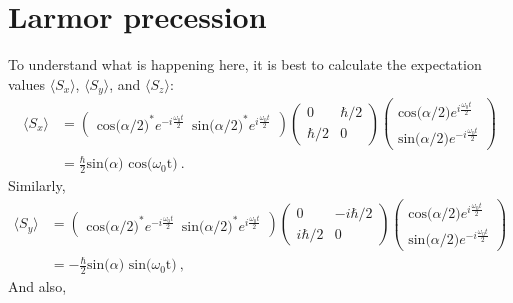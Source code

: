 \section{Larmor precession\label{sec:Larmor}}
To understand what is happening here, it is best to calculate the
expectation values $\langle S_x \rangle$, $\langle S_y \rangle$, and
$\langle S_z \rangle$:
\begin{align}
  \langle S_{x} \rangle & =
                          \begin{pmatrix} \textrm{cos($\alpha$/2)}^{*} e^{-i \frac{\omega_{0}t}{2}} \,\,\, \textrm{sin($\alpha$/2)}^{*} e^{i \frac{\omega_{0}t}{2}}
                          \end{pmatrix}
                          \begin{pmatrix} 0 & \hbar/2\\ \hbar/2 & 0
                          \end{pmatrix}
                                                                  \begin{pmatrix} \textrm{cos($\alpha$/2)} e^{i \frac{\omega_{0}t}{2}}\\ \textrm{sin($\alpha$/2)} e^{-i \frac{\omega_{0}t}{2}} \end{pmatrix}  \\ \nonumber
  & = \frac{\hbar}{2}\textrm{sin($\alpha$) cos($\omega_{0}$t)}~.
\end{align}
Similarly,
\begin{equation}
\begin{split}
\langle S_{y} \rangle & = \begin{pmatrix} \textrm{cos($\alpha$/2)}^{*} e^{-i \frac{\omega_{0}t}{2}} \,\,\, \textrm{sin($\alpha$/2)}^{*} e^{i \frac{\omega_{0}t}{2}} \end{pmatrix}  \begin{pmatrix} 0 & -i\hbar/2\\ i\hbar/2 & 0 \end{pmatrix}  \begin{pmatrix} \textrm{cos($\alpha$/2)} e^{i \frac{\omega_{0}t}{2}}\\ \textrm{sin($\alpha$/2)} e^{-i \frac{\omega_{0}t}{2}} \end{pmatrix} \\
& = -\frac{\hbar}{2}\textrm{sin($\alpha$) sin($\omega_{0}$t)}~,
\end{split}
\end{equation}
And also,
